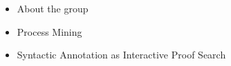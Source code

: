\documentclass{beamer}
\begin{document}
%
%
%
%
%
%

\begin{frame}{}
    \setcounter{framenumber}{1}
    \begin{itemize}
        \item About the group
        \item Process Mining
        \item Syntactic Annotation as Interactive Proof Search
    \end{itemize}
\end{frame}
\end{document}
